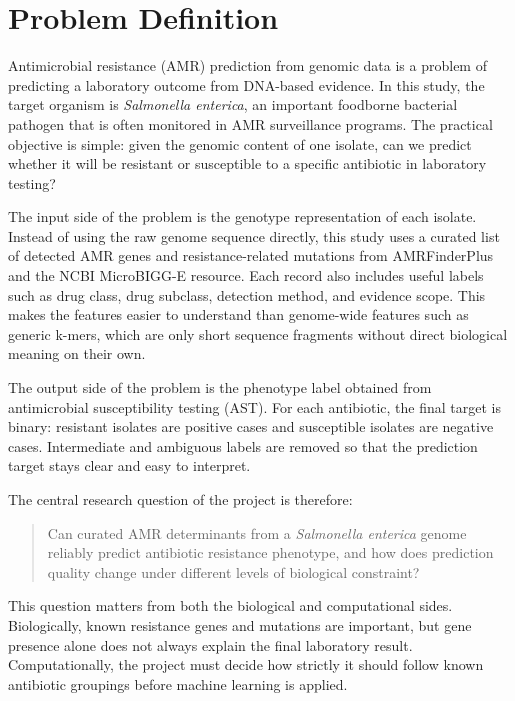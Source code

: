 \section{Problem Definition}

Antimicrobial resistance (AMR) prediction from genomic data is a problem of predicting a laboratory outcome from DNA-based evidence. In this study, the target organism is \textit{Salmonella enterica}, an important foodborne bacterial pathogen that is often monitored in AMR surveillance programs. The practical objective is simple: given the genomic content of one isolate, can we predict whether it will be resistant or susceptible to a specific antibiotic in laboratory testing?

The input side of the problem is the genotype representation of each isolate. Instead of using the raw genome sequence directly, this study uses a curated list of detected AMR genes and resistance-related mutations from AMRFinderPlus and the NCBI MicroBIGG-E resource. Each record also includes useful labels such as drug class, drug subclass, detection method, and evidence scope. This makes the features easier to understand than genome-wide features such as generic k-mers, which are only short sequence fragments without direct biological meaning on their own.

The output side of the problem is the phenotype label obtained from antimicrobial susceptibility testing (AST). For each antibiotic, the final target is binary: resistant isolates are positive cases and susceptible isolates are negative cases. Intermediate and ambiguous labels are removed so that the prediction target stays clear and easy to interpret.

The central research question of the project is therefore:

\begin{quote}
Can curated AMR determinants from a \textit{Salmonella enterica} genome reliably predict antibiotic resistance phenotype, and how does prediction quality change under different levels of biological constraint?
\end{quote}

This question matters from both the biological and computational sides. Biologically, known resistance genes and mutations are important, but gene presence alone does not always explain the final laboratory result. Computationally, the project must decide how strictly it should follow known antibiotic groupings before machine learning is applied.


